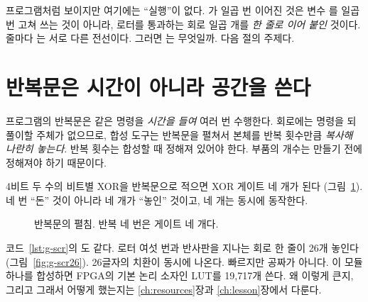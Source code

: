 프로그램처럼 보이지만 여기에는 ``실행''이 없다. 가 일곱 번 이어진 것은 변수 를 일곱
번 고쳐 쓰는 것이 아니라, 로터를 통과하는 회로 일곱 개를 \emph{한 줄로 이어 붙인} 것이다. 줄마다
는 서로 다른 전선이다. 그러면 는 무엇일까. 다음 절의 주제다.

\section{반복문은 시간이 아니라 공간을 쓴다}

\Why 프로그램의 반복문은 같은 명령을 \emph{시간을 들여} 여러 번 수행한다. 회로에는 명령을 되풀이할
주체가 없으므로, 합성 도구는 반복문을 펼쳐서 본체를 반복 횟수만큼 \emph{복사해 나란히 놓는다}.
반복 횟수는 합성할 때 정해져 있어야 한다. 부품의 개수는 만들기 전에 정해져야 하기 때문이다.

\General 4비트 두 수의 비트별 XOR을 반복문으로 적으면 XOR 게이트 네 개가 된다
(그림~\ref{fig:g-unroll}). 네 번 ``돈'' 것이 아니라 네 개가 ``놓인'' 것이고, 네 개는 동시에 동작한다.

\begin{figure}[ht]
\centering
{}
\caption{반복문의 펼침. 반복 네 번은 게이트 네 개다.}
\label{fig:g-unroll}
\end{figure}

\Ours 코드~\ref{lst:g-scr}의 도 같다. 로터 여섯 번과 반사판을 지나는
회로 한 줄이 26개 놓인다(그림~\ref{fig:g-scr26}). 26글자의 치환이 동시에 나온다. 빠르지만 공짜가 아니다.
이 모듈 하나를 합성하면 FPGA의 기본 논리 소자인 LUT를 19,717개 쓴다. 왜 이렇게 큰지, 그리고 그래서 어떻게
했는지는 \ref{ch:resources}장과 \ref{ch:lesson}장에서 다룬다.

